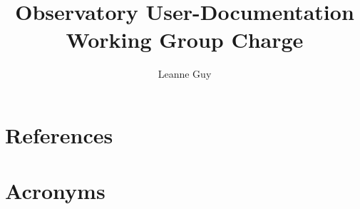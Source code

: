 \documentclass[TS,authoryear,toc]{lsstdoc}
\title{Observatory User-Documentation Working Group Charge}
\author{%
Leanne Guy
}
\date{\vcsDate}
\begin{document}
\maketitle


\appendix
\section{References} \label{sec:bib}
\renewcommand{\refname}{} %


\section{Acronyms} \label{sec:acronyms}

\end{document}
